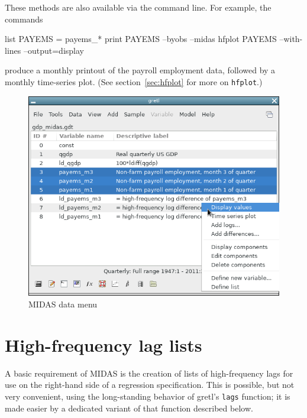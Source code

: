 \documentclass{article}
\begin{document}
These methods are also available via the command line. For example,
the commands
%
\begin{code}
list PAYEMS = payems_*
print PAYEMS --byobs --midas
hfplot PAYEMS --with-lines --output=display
\end{code}
%
produce a monthly printout of the payroll employment data, followed by
a monthly time-series plot. (See section~\ref{sec:hfplot} for more on
\texttt{hfplot}.)

\begin{figure}[htbp]
  \centering
  \includegraphics[scale=0.5]{figures/midas-list-menu}
  \caption{MIDAS data menu}
  \label{fig:data-menu}
\end{figure}


\section{High-frequency lag lists}
\label{sec:hflags}

A basic requirement of MIDAS is the creation of lists of
high-frequency lags for use on the right-hand side of a regression
specification. This is possible, but not very convenient, using the
long-standing behavior of gretl's \texttt{lags} function; it is made
easier by a dedicated variant of that function described below.
\end{document}
